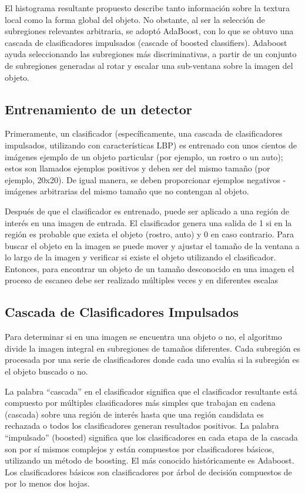 El histograma resultante propuesto describe tanto información sobre la textura local como la forma global del objeto.
No obstante, al ser la selección de subregiones relevantes arbitraria, se adoptó AdaBoost, con lo que se obtuvo una cascada de clasificadores impulsados (cascade of boosted classifiers). Adaboost \cite{Viola2001-rh} ayuda seleccionando las subregiones más discriminativas, a partir de un conjunto de subregiones generadas al rotar y escalar una sub-ventana sobre la imagen del objeto. 

\subsection{Entrenamiento de un detector}
Primeramente, un clasificador (específicamente, una cascada de clasificadores impulsados, utilizando con características LBP) es entrenado con unos cientos de imágenes ejemplo de un objeto particular (por ejemplo, un rostro o un auto); estos son llamados ejemplos positivos y deben ser del mismo tamaño (por ejemplo, 20x20). De igual manera, se deben proporcionar ejemplos negativos - imágenes arbitrarias del mismo tamaño que no contengan al objeto.

Después de que el clasificador es entrenado, puede ser aplicado a una región de interés en una imagen de entrada. El clasificador genera una salida de 1 si en la región es probable que exista el objeto (rostro, auto) y 0 en caso contrario. Para buscar el objeto en la imagen se puede mover y ajustar el tamaño de la ventana a lo largo de la imagen y verificar si existe el objeto utilizando el clasificador. Entonces, para encontrar un objeto de un tamaño desconocido en una imagen el proceso de escaneo debe ser realizado múltiples veces y en diferentes escalas \cite{OpenCV2016-vq}


\subsection{Cascada de Clasificadores Impulsados}
Para determinar si en una imagen se encuentra una objeto o no, el algoritmo divide la imagen integral en subregiones de tamaños diferentes. Cada subregión es procesada por una serie de clasificadores donde cada uno evalúa si la subregión es el objeto buscado o no.

La palabra “cascada” en el clasificador significa que el clasificador resultante está compuesto por múltiples clasificadores más simples que trabajan en cadena (cascada) sobre una región de interés hasta que una región candidata es rechazada o todos los clasificadores generan resultados positivos. La palabra “impulsado” (boosted) significa que los clasificadores en cada etapa de la cascada son por sí mismos complejos y están compuestos por clasificadores básicos, utilizando un método de boosting. El más conocido históricamente es Adaboost. Los clasificadores básicos son clasificadores por árbol de decisión compuestos de por lo menos dos hojas.

